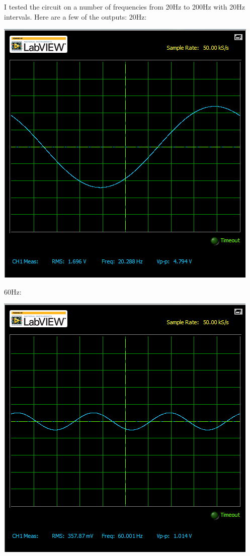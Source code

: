 \documentclass[12pt,letterpaper,boxed]{hmcpset}
\begin{document}
I tested the circuit on a number of frequencies from 20Hz to 200Hz with 20Hz intervals. Here are a few of the outputs:
\newpage
20Hz:
\begin{center}
\includegraphics[scale=.8]{20Hz}
\end{center}
60Hz:
\begin{center}
\includegraphics[scale=.8]{60Hz}
\end{center}
\end{document}
